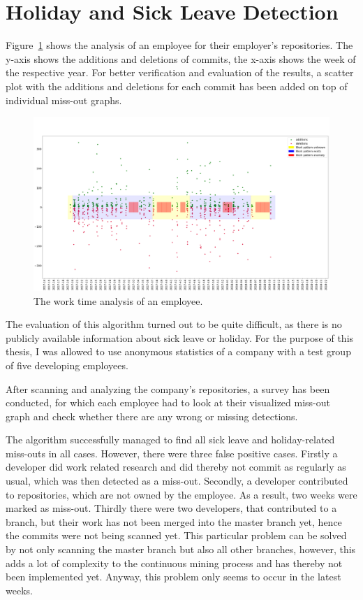 \section{Holiday and Sick Leave Detection}

Figure~\ref{fig:missing-time} shows the analysis of an employee for their employer's repositories.
The y-axis shows the additions and deletions of commits, the x-axis shows the week of the respective year.
For better verification and evaluation of the results, a scatter plot with the additions and deletions for each commit has been added on top of individual miss-out graphs.

\begin{figure}[H]
    \includegraphics[scale=0.20]{./graphs/analysis/work-time-analysis}
    \centering
    \caption{The work time analysis of an employee.}\label{fig:missing-time}
\end{figure}

The evaluation of this algorithm turned out to be quite difficult, as there is no publicly available information about sick leave or holiday.
For the purpose of this thesis, I was allowed to use anonymous statistics of a company with a test group of five developing employees.

After scanning and analyzing the company's repositories, a survey has been conducted, for which each employee had to look at their visualized miss-out graph and check whether there are any wrong or missing detections.

The algorithm successfully managed to find all sick leave and holiday-related miss-outs in all cases.
However, there were three false positive cases.
Firstly a developer did work related research and did thereby not commit as regularly as usual, which was then detected as a miss-out.
Secondly, a developer contributed to repositories, which are not owned by the employee.
As a result, two weeks were marked as miss-out.
Thirdly there were two developers, that contributed to a branch, but their work has not been merged into the master branch yet, hence the commits were not being scanned yet.
This particular problem can be solved by not only scanning the master branch but also all other branches, however, this adds a lot of complexity to the continuous mining process and has thereby not been implemented yet.
Anyway, this problem only seems to occur in the latest weeks.

